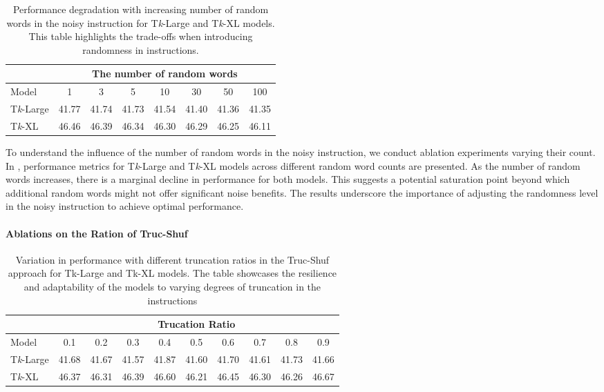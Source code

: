 \begin{table}[h]
\centering
\caption{Performance degradation with increasing number of random words in the noisy instruction for T\textit{k}-Large and T\textit{k}-XL models. This table highlights the trade-offs when introducing randomness in instructions.}
\label{tab:ab_rand_word}
\begin{tabular}{@{}l|ccccccc@{}}
\toprule
                                   & \multicolumn{7}{c}{The number of random words}        \\\midrule
Model                              & 1     & 3     & 5     & 10    & 30    & 50    & 100   \\\midrule
T\textit{k}-Large & 41.77 & 41.74 & 41.73 & 41.54 & 41.40 & 41.36 & 41.35 \\
T\textit{k}-XL    & 46.46 & 46.39 & 46.34 & 46.30 & 46.29 & 46.25 & 46.11 \\ \bottomrule
\end{tabular}%
\end{table}

To understand the influence of the number of random words in the noisy instruction, we conduct ablation experiments varying their count. In , performance metrics for T\textit{k}-Large and T\textit{k}-XL models across different random word counts are presented. As the number of random words increases, there is a marginal decline in performance for both models. This suggests a potential saturation point beyond which additional random words might not offer significant noise benefits. The results underscore the importance of adjusting the randomness level in the noisy instruction to achieve optimal performance.


\paragraph{Ablations on the Ration of Truc-Shuf}



\begin{table}[h]
\centering
\caption{Variation in performance with different truncation ratios in the Truc-Shuf approach for Tk-Large and Tk-XL models. The table showcases the resilience and adaptability of the models to varying degrees of truncation in the instructions}
\label{tab:ab_trunc-shuff}
\begin{tabular}{@{}l|ccccccccc@{}}
\toprule
         & \multicolumn{9}{c}{Trucation Ratio}                                   \\\midrule
Model    & 0.1   & 0.2   & 0.3   & 0.4   & 0.5   & 0.6   & 0.7   & 0.8   & 0.9   \\\midrule
T\textit{k}-Large & 41.68 & 41.67 & 41.57 & 41.87 & 41.60 & 41.70 & 41.61 & 41.73 & 41.66 \\
T\textit{k}-XL    & 46.37 & 46.31 & 46.39 & 46.60 & 46.21 & 46.45 & 46.30 & 46.26 & 46.67 \\\bottomrule
\end{tabular}%
\end{table}

